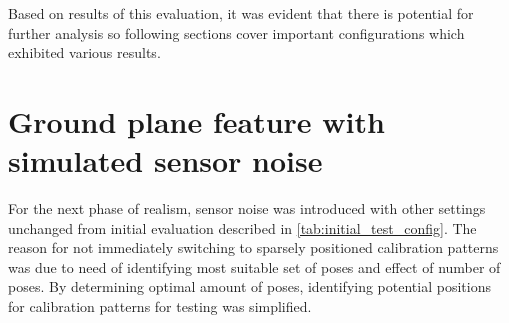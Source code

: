 \documentclass[english, printversion, nomenclature, notitle]{tuvisionthesis} %
\begin{document}
Based on results of this evaluation, it was evident that there is potential for further analysis so following sections cover important configurations which exhibited various results.

\section{Ground plane feature with simulated sensor noise}
\label{sec:ground_plane_test}

For the next phase of realism, sensor noise was introduced with other settings unchanged from initial evaluation described in \cref{tab:initial_test_config}. The reason for not immediately switching to sparsely positioned calibration patterns was due to need of identifying most suitable set of poses and effect of number of poses. By determining optimal amount of poses, identifying potential positions for calibration patterns for testing was simplified.

\begin{table}[]
	\caption[Results from testing with ground-plane calibration feature.]{Results from testing with ground-plane calibration feature. The results depicts several trends between calibration pose count, type of induced errors and success/ failure statistics}
\end{table}
\end{document}
